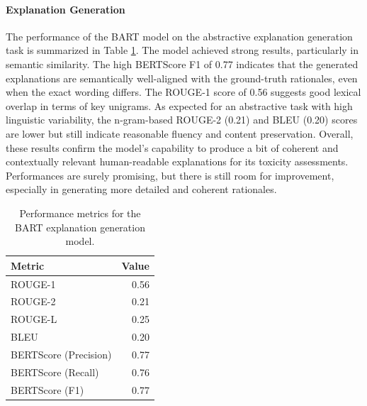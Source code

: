 \documentclass[twocolumn]{ceurart}
\begin{document}
\paragraph{Explanation Generation}

The performance of the BART model on the abstractive explanation generation task is summarized in Table \ref{tab:test_metrics}. The model achieved strong results, particularly in semantic similarity. The high BERTScore F1 of 0.77 indicates that the generated explanations are semantically well-aligned with the ground-truth rationales, even when the exact wording differs. The ROUGE-1 score of 0.56 suggests good lexical overlap in terms of key unigrams. As expected for an abstractive task with high linguistic variability, the n-gram-based ROUGE-2 (0.21) and BLEU (0.20) scores are lower but still indicate reasonable fluency and content preservation. Overall, these results confirm the model's capability to produce a bit of coherent and contextually relevant human-readable explanations for its toxicity assessments. Performances are surely promising, but there is still room for improvement, especially in generating more detailed and coherent rationales.

\begin{table}[htbp]
    \centering
    \caption{Performance metrics for the BART explanation generation model.}
    \label{tab:test_metrics}
        \begin{tabular}{lr}
        \hline
        \textbf{Metric} & \textbf{Value} \\
        \hline
        ROUGE-1 & 0.56 \\
        ROUGE-2 & 0.21 \\
        ROUGE-L & 0.25 \\
        BLEU & 0.20 \\
        BERTScore (Precision) & 0.77 \\
        BERTScore (Recall) & 0.76 \\
        BERTScore (F1) & 0.77 \\
        \hline
    \end{tabular}
\end{table}
\end{document}
